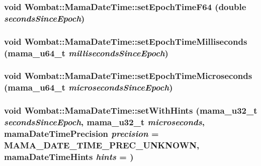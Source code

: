 \label{classWombat_1_1MamaDateTime_a11526c02ff3b37ce8e6678d176219cc8}
\hypertarget{classWombat_1_1MamaDateTime_a1bdc0da59f4470e4ee69f21f177fb23b}{
\subsubsection[{setEpochTimeF64}]{\setlength{\rightskip}{0pt plus 5cm}void Wombat::MamaDateTime::setEpochTimeF64 (double {\em secondsSinceEpoch})}}
\label{classWombat_1_1MamaDateTime_a1bdc0da59f4470e4ee69f21f177fb23b}
\hypertarget{classWombat_1_1MamaDateTime_aaea9d4b7234ccdc8c7e56580e4802a48}{
\subsubsection[{setEpochTimeMilliseconds}]{\setlength{\rightskip}{0pt plus 5cm}void Wombat::MamaDateTime::setEpochTimeMilliseconds (mama\_\-u64\_\-t {\em millisecondsSinceEpoch})}}
\label{classWombat_1_1MamaDateTime_aaea9d4b7234ccdc8c7e56580e4802a48}
\hypertarget{classWombat_1_1MamaDateTime_a1e0773b5b60e6786921cfa8c7e6f6403}{
\subsubsection[{setEpochTimeMicroseconds}]{\setlength{\rightskip}{0pt plus 5cm}void Wombat::MamaDateTime::setEpochTimeMicroseconds (mama\_\-u64\_\-t {\em microsecondsSinceEpoch})}}
\label{classWombat_1_1MamaDateTime_a1e0773b5b60e6786921cfa8c7e6f6403}
\hypertarget{classWombat_1_1MamaDateTime_a1a4e876163aae99f96fa98162424895b}{
\subsubsection[{setWithHints}]{\setlength{\rightskip}{0pt plus 5cm}void Wombat::MamaDateTime::setWithHints (mama\_\-u32\_\-t {\em secondsSinceEpoch}, \/  mama\_\-u32\_\-t {\em microseconds}, \/  mamaDateTimePrecision {\em precision} = {\ttfamily MAMA\_\-DATE\_\-TIME\_\-PREC\_\-UNKNOWN}, \/  mamaDateTimeHints {\em hints} = {})}}

